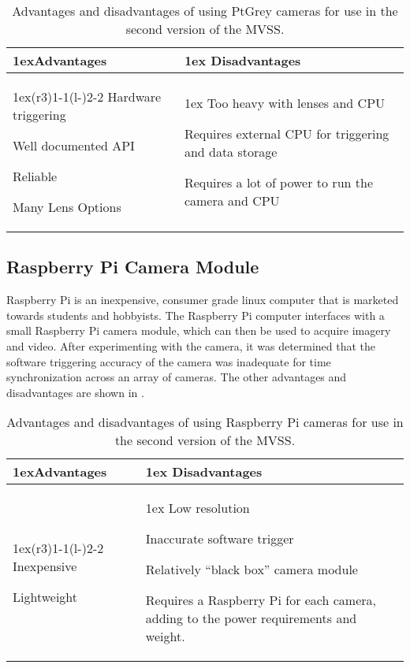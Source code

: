 	\begin{table}[H]
		\begin{tabularx}{\linewidth}{>{\parskip1ex}X@{\kern4\tabcolsep}>{\parskip1ex}X}
			\toprule
			\hfil\bfseries Advantages
			&
			\hfil\bfseries Disadvantages
			\\\cmidrule(r{3\tabcolsep}){1-1}\cmidrule(l{-\tabcolsep}){2-2}
			Hardware triggering\par
			Well documented API\par
			Reliable\par
			Many Lens Options\par
			&
			Too heavy with lenses and CPU\par
			Requires external CPU for triggering and data storage\par
			Requires a lot of power to run the camera and CPU
			\\\bottomrule
		\end{tabularx}
		\caption{Advantages and disadvantages of using PtGrey cameras for use in the second version of the MVSS.}
		\label{tab:PtGrey}
	\end{table}
	
	\subsection{Raspberry Pi Camera Module}
	Raspberry Pi is an inexpensive, consumer grade linux computer that is marketed towards students and hobbyists.  The Raspberry Pi computer interfaces with a small Raspberry Pi camera module, which can then be used to acquire imagery and video.  After experimenting with the camera, it was determined that the software triggering accuracy of the camera was inadequate for time synchronization across an array of cameras.  The other advantages and disadvantages are shown in \tabref{tab:raspi}.
	
	\begin{table}[H]
		\begin{tabularx}{\linewidth}{>{\parskip1ex}X@{\kern4\tabcolsep}>{\parskip1ex}X}
			\toprule
			\hfil\bfseries Advantages
			&
			\hfil\bfseries Disadvantages
			\\\cmidrule(r{3\tabcolsep}){1-1}\cmidrule(l{-\tabcolsep}){2-2}
			Inexpensive\par
			Lightweight\par
			&
			Low resolution\par
			Inaccurate software trigger\par
			Relatively ``black box'' camera module\par
			Requires a Raspberry Pi for each camera, adding to the power requirements and weight.
			\\\bottomrule
		\end{tabularx}
		\caption{Advantages and disadvantages of using Raspberry Pi cameras for use in the second version of the MVSS.}
		\label{tab:raspi}
	\end{table}
	
